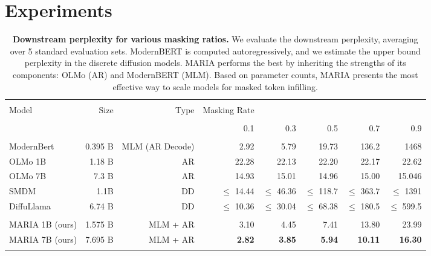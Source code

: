 \section{Experiments}

\begin{table*}[t]
    \centering
\begin{tabular}{l r r r r r r r}
 \toprule & \\[-2ex]
 Model & Size & Type  & Masking Rate & & & &  \\[0.5ex]
 \hline & \\[-2ex]
 & &  & 0.1 & 0.3 & 0.5 & 0.7 & 0.9 \\[0.5ex]
 \hline & \\[-2ex]

ModernBert & 0.395 B & MLM (AR Decode) & 2.92 & 5.79 & 19.73 & 136.2 & 1468 \\
OLMo 1B & 1.18 B & AR & 22.28 & 22.13 & 22.20 & 22.17 & 22.62 \\
OLMo 7B & 7.3 B & AR & 14.93 & 15.01 & 14.96 & 15.00 & 15.046 \\
SMDM &1.1B & DD & $\leq$ 14.44 & $\leq$ 46.36 & $\leq$ 118.7 & $\leq$ 363.7 & $\leq$ 1391 \\
DiffuLlama & 6.74 B & DD & $\leq$ 10.36 & $\leq$ 30.04 & $\leq$ 68.38 & $\leq$ 180.5 & $\leq$ 599.5\\[1ex]
\hline & \\[-1.5ex]
MARIA 1B (ours) & 1.575 B &MLM + AR& 3.10 & 4.45 & 7.41 & 13.80 & 23.99 \\
MARIA 7B (ours) & 7.695 B & MLM + AR & \textbf{2.82} & \textbf{3.85} & \textbf{5.94} & \textbf{10.11} & \textbf{16.30} \\[1ex]
\bottomrule & \\[-1.5ex]
\end{tabular}
\caption{\textbf{Downstream perplexity for various masking ratios.} We evaluate the downstream perplexity, averaging over 5 standard evaluation sets. ModernBERT is computed autoregressively, and we estimate the upper bound perplexity in the discrete diffusion models. MARIA performs the best by inheriting the strengths of its components: OLMo (AR) and ModernBERT (MLM). Based on parameter counts, MARIA presents the most effective way to scale models for masked token infilling.}
\end{table*}


